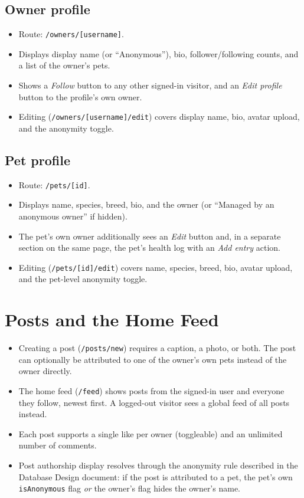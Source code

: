 \documentclass[11pt,a4paper]{article}
\begin{document}
\subsection{Owner profile}
\begin{itemize}[leftmargin=*]
  \item Route: \texttt{/owners/[username]}.
  \item Displays display name (or ``Anonymous''), bio, follower/following counts, and a
        list of the owner's pets.
  \item Shows a \emph{Follow} button to any other signed-in visitor, and an
        \emph{Edit profile} button to the profile's own owner.
  \item Editing (\texttt{/owners/[username]/edit}) covers display name, bio, avatar
        upload, and the anonymity toggle.
\end{itemize}

\subsection{Pet profile}
\begin{itemize}[leftmargin=*]
  \item Route: \texttt{/pets/[id]}.
  \item Displays name, species, breed, bio, and the owner (or ``Managed by an anonymous
        owner'' if hidden).
  \item The pet's own owner additionally sees an \emph{Edit} button and, in a
        separate section on the same page, the pet's health log with an
        \emph{Add entry} action.
  \item Editing (\texttt{/pets/[id]/edit}) covers name, species, breed, bio, avatar
        upload, and the pet-level anonymity toggle.
\end{itemize}

\section{Posts and the Home Feed}
\begin{itemize}[leftmargin=*]
  \item Creating a post (\texttt{/posts/new}) requires a caption, a photo, or both. The
        post can optionally be attributed to one of the owner's own pets instead of the
        owner directly.
  \item The home feed (\texttt{/feed}) shows posts from the signed-in user and everyone
        they follow, newest first. A logged-out visitor sees a global feed of all posts
        instead.
  \item Each post supports a single like per owner (toggleable) and an unlimited number
        of comments.
  \item Post authorship display resolves through the anonymity rule described in the
        Database Design document: if the post is attributed to a pet, the pet's own
        \texttt{isAnonymous} flag \emph{or} the owner's flag hides the owner's name.
\end{itemize}
\end{document}
